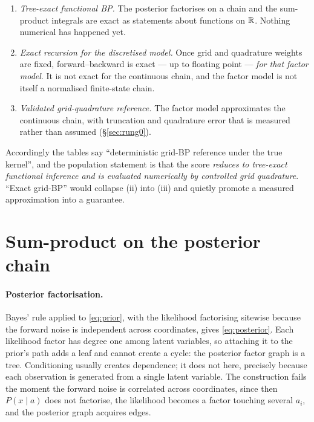 \begin{enumerate}
\item \emph{Tree-exact functional BP.} The posterior factorises on a chain and the sum-product
integrals are exact as statements about functions on $\mathbb{R}$. Nothing numerical has happened yet.
\item \emph{Exact recursion for the discretised model.} Once grid and quadrature weights are
fixed, forward--backward is exact --- up to floating point --- \emph{for that factor model}. It
is not exact for the continuous chain, and the factor model is not itself a normalised
finite-state chain.
\item \emph{Validated grid-quadrature reference.} The factor model approximates the
continuous chain, with truncation and quadrature error that is measured rather than assumed
(\S\ref{sec:rung0}).
\end{enumerate}

Accordingly the tables say ``deterministic grid-BP reference under the true kernel'', and the
population statement is that the score \emph{reduces to tree-exact functional inference and is
evaluated numerically by controlled grid quadrature}. ``Exact grid-BP'' would collapse (ii) into
(iii) and quietly promote a measured approximation into a guarantee.

\section{Sum-product on the posterior chain}
\label{app:bp}

\paragraph{Posterior factorisation.} Bayes' rule applied to \eqref{eq:prior}, with the likelihood
factorising sitewise because the forward noise is independent across coordinates, gives
\eqref{eq:posterior}. Each likelihood factor has degree one among latent variables, so attaching
it to the prior's path adds a leaf and cannot create a cycle: the posterior factor graph is a
tree. Conditioning usually creates dependence; it does not here, precisely because each
observation is generated from a single latent variable. The construction fails the moment the
forward noise is correlated across coordinates, since then $P(x\mid a)$ does not factorise, the
likelihood becomes a factor touching several $a_i$, and the posterior graph acquires edges.

